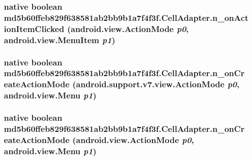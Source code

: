 \hypertarget{classmd5b60ffeb829f638581ab2bb9b1a7f4f3f_1_1_cell_adapter_c87b7ef02f8bf331b2f74e970f872e74}{
\subsubsection[{n\_\-onActionItemClicked}]{\setlength{\rightskip}{0pt plus 5cm}native boolean md5b60ffeb829f638581ab2bb9b1a7f4f3f.CellAdapter.n\_\-onActionItemClicked (android.view.ActionMode {\em p0}, \/  android.view.MenuItem {\em p1})}}
\label{classmd5b60ffeb829f638581ab2bb9b1a7f4f3f_1_1_cell_adapter_c87b7ef02f8bf331b2f74e970f872e74}


\hypertarget{classmd5b60ffeb829f638581ab2bb9b1a7f4f3f_1_1_cell_adapter_a35d121a32d8f37e712467c591e1e051}{
\subsubsection[{n\_\-onCreateActionMode}]{\setlength{\rightskip}{0pt plus 5cm}native boolean md5b60ffeb829f638581ab2bb9b1a7f4f3f.CellAdapter.n\_\-onCreateActionMode (android.support.v7.view.ActionMode {\em p0}, \/  android.view.Menu {\em p1})}}
\label{classmd5b60ffeb829f638581ab2bb9b1a7f4f3f_1_1_cell_adapter_a35d121a32d8f37e712467c591e1e051}


\hypertarget{classmd5b60ffeb829f638581ab2bb9b1a7f4f3f_1_1_cell_adapter_fa3d0eff290c0ee14f10b4dc20799c00}{
\subsubsection[{n\_\-onCreateActionMode}]{\setlength{\rightskip}{0pt plus 5cm}native boolean md5b60ffeb829f638581ab2bb9b1a7f4f3f.CellAdapter.n\_\-onCreateActionMode (android.view.ActionMode {\em p0}, \/  android.view.Menu {\em p1})}}
\label{classmd5b60ffeb829f638581ab2bb9b1a7f4f3f_1_1_cell_adapter_fa3d0eff290c0ee14f10b4dc20799c00}


